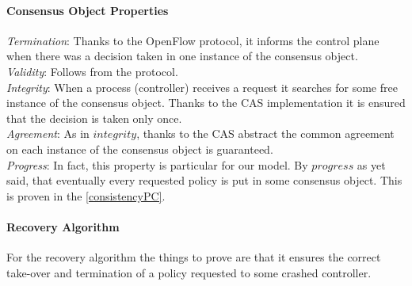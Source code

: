 \documentclass{article}
\theoremstyle{remark}
\begin{document}
\paragraph{Consensus Object Properties}
\emph{Termination}: Thanks to the OpenFlow protocol, it informs the control plane when there was a decision taken in one instance of the consensus object. 
\\
\emph{Validity}: Follows from the protocol.
\\
\emph{Integrity}: When a process (controller) receives a request it searches for some free instance of the consensus object. Thanks to the CAS implementation it is ensured that the decision is taken only once.
\\
\emph{Agreement}: As in $integrity$, thanks to the CAS abstract the common agreement on each instance of the consensus object is guaranteed.
\\
\emph{Progress}: In fact, this property is particular for our model. By $progress$ as yet said, that eventually every requested policy is put in some consensus object. This is proven in the \ref{consistencyPC}.
\paragraph{Recovery Algorithm}
For the recovery algorithm the things to prove are that it ensures the correct take-over and termination of a policy requested to some crashed controller. 
\end{document}
